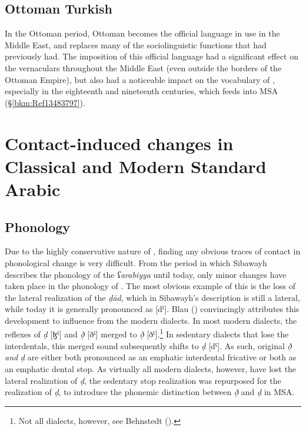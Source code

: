 \documentclass[output=paper]{langsci/langscibook}
\begin{document}
\subsection{Ottoman Turkish}

In the Ottoman period, Ottoman  becomes the official language in use in the Middle East, and replaces many of the sociolinguistic functions that  had previously had. The {imposition} of this official language had a significant effect on the  vernaculars throughout the Middle East (even outside the borders of the Ottoman Empire), but also had a noticeable impact on the vocabulary of , especially in the eighteenth and nineteenth centuries, which feeds into MSA (§\ref{bkm:Ref13483797}).

\section{Contact-induced changes in Classical and Modern Standard Arabic}
\subsection{\label{bkm:Ref12953419}Phonology}

Due to the highly conservative nature of , finding any obvious traces of contact in phonological change is very difficult. From the period in which Sibawayh describes the phonology of the \textit{ʕarabiyya} until today, only minor changes have taken place in the phonology of . The most obvious example of this is the loss of the lateral realization of the \textit{ḍād}, which in Sibawayh’s description is still a lateral, while today it is generally pronounced as [dˤ]. Blau (\citeyear[162--163]{Blau1969}) convincingly attributes this development to influence from the modern dialects. In most modern  dialects, the reflexes of \textit{ḍ} [ɮˤ] and \textit{ð̣} [ðˤ] {merged} to \textit{ð̣} [ðˤ].\footnote{Not all dialects, however, see Behnstedt (\citeyear[16ff.]{Behnstedt2016Yemen}).} In sedentary dialects that lose the interdentals, this {merged} sound subsequently shifts to \textit{ḍ} [dˤ]. As such, original \textit{ð̣} \textit{and} \textit{ḍ} are either both pronounced as an {emphatic} interdental fricative or both as an {emphatic} dental stop. As virtually all modern dialects, however, have lost the lateral realization of \textit{ḍ}, the sedentary stop realization was repurposed for the realization of \textit{ḍ}, to introduce the phonemic distinction between \textit{ð̣} and \textit{ḍ} in MSA.
\end{document}
